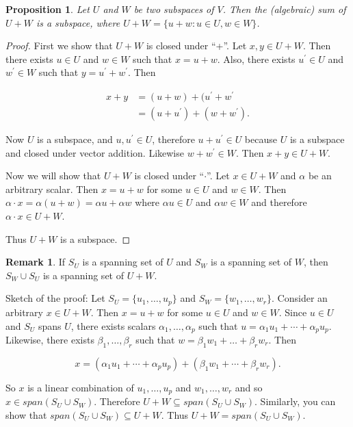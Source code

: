 \documentclass[12pt]{article}
\newtheorem*{proposition}{Proposition}
\theoremstyle{definition}
\newtheorem*{remark}{Remark}
\begin{document}
\begin{enumerate}[label = (\arabic*)]
\begin{proposition}
Let $U$ and $W$ be two subspaces of $V$. Then the (algebraic) sum of $U + W$ is a subspace, where
$U + W = \{u + w : u \in U, w \in W\}$.
\end{proposition}

\begin{proof}
First we show that $U + W$ is closed under ``+''. Let $x, y \in U + W$. Then there exists
$u \in U$ and $w \in W$ such that $x = u + w$. Also, there exists $u^{\prime} \in U$ and
$w^{\prime} \in W$ such that $y = u^{\prime} + w^{\prime}$. Then

\begin{align*}
x + y &= (u + w) + (u^{\prime} + w^{\prime} \\
&= (u + u^{\prime}) + (w + w^{\prime}).
\end{align*}

Now $U$ is a subspace, and $u, u^{\prime} \in U$, therefore $u + u^{\prime} \in U$ because
$U$ is a subspace and closed under vector addition. Likewise $w + w^{\prime} \in W$. Then
$x + y \in U + W$.

Now we will show that $U + W$ is closed under ``$\cdot$''. Let $x \in U + W$ and $\alpha$
be an arbitrary scalar. Then $x = u + w$ for some $u \in U$ and $w \in W$. Then
$\alpha \cdot x = \alpha (u + w) = \alpha u + \alpha w$ where $\alpha u \in U$ and
$\alpha w \in W$ and therefore $\alpha \cdot x \in U + W$.

Thus $U + W$ is a subspace.
\end{proof}

\begin{remark}
If $S_U$ is a spanning set of $U$ and $S_W$ is a spanning set of $W$, then $S_W \cup S_U$
is a spanning set of $U + W$.

Sketch of the proof: Let $S_U = \{u_1, \dots, u_p\}$ and $S_W = \{w_1, \ldots, w_r\}$.
Consider an arbitrary $x \in U + W$. Then $x = u + w$ for some $u \in U$ and $w \in W$.
Since $u \in U$ and $S_U$ spans $U$, there exists scalars $\alpha_1, \ldots, \alpha_p$
such that $u = \alpha_1 u_1 + \cdots + \alpha_p u_p$. Likewise, there exists
$\beta_1, \ldots, \beta_r$ such that $w = \beta_1 w_1 + \ldots + \beta_r w_r$. Then

\[
x = (\alpha_1 u_1 + \cdots + \alpha_p u_p) + (\beta_1 w_1 + \cdots + \beta_r w_r).
\]

So $x$ is a linear combination of $u_1, \ldots, u_p$ and $w_1, \ldots, w_r$ and so
$x \in span(S_U \cup S_W)$. Therefore $U + W \subseteq span(S_U \cup S_W)$. Similarly,
you can show that $span(S_U \cup S_W) \subseteq U + W$. Thus $U + W = span(S_U \cup S_W)$.
\end{remark}
\end{enumerate}
\end{document}
